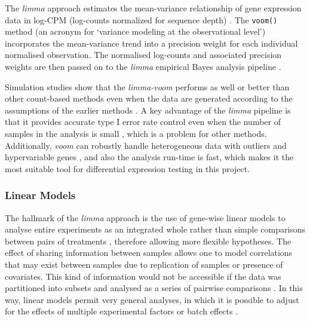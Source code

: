         The \textit{limma} approach estimates the mean-variance relationship of gene expression data in log-CPM  (log-counts normalized for sequence depth) \cite{Law2014}. The \texttt{voom()} method (an acronym for ‘variance modeling at the observational level’) incorporates the mean-variance trend into a precision weight for each individual normalised observation. The normalised log-counts and associated precision weights are then passed on to the \textit{limma} empirical Bayes analysis pipeline \cite{Law2014}.
        
        Simulation studies show that the \textit{limma-voom} performs as well or better than other count-based methods even when the data are generated according to the assumptions of the earlier methods  \cite{Law2014}. A key advantage of the \textit{limma} pipeline is that it provides accurate type I error rate control even when the number of samples in the analysis is small \cite{SmythLimma:Guide}, which is a problem for other methods. Additionally, \textit{voom} can robustly handle heterogeneous data with outliers and hypervariable genes \cite{phipson2013empirical}, and also the analysis run-time is fast, which makes it the most suitable tool for differential expression testing in this project. 
        
        \subsubsection{Linear Models}
        
        The hallmark of the \textit{limma} approach is the use of gene-wise linear models to analyse entire experiments as an integrated whole rather than simple comparisons between pairs of treatments  \cite{Ritchie2015LimmaStudies}, therefore allowing more flexible hypotheses. The effect of sharing information between samples allows one to model correlations that may exist between samples due to replication of samples or presence of covariates. This kind of information would not be accessible if the data was partitioned into subsets and analysed as a series of pairwise comparisons \cite{Love2016RNA-SeqApproved}. In this way, linear models permit very general analyses, in which it is possible to adjust for the effects of multiple experimental factors or batch effects  \cite{Ritchie2015LimmaStudies}.
        
